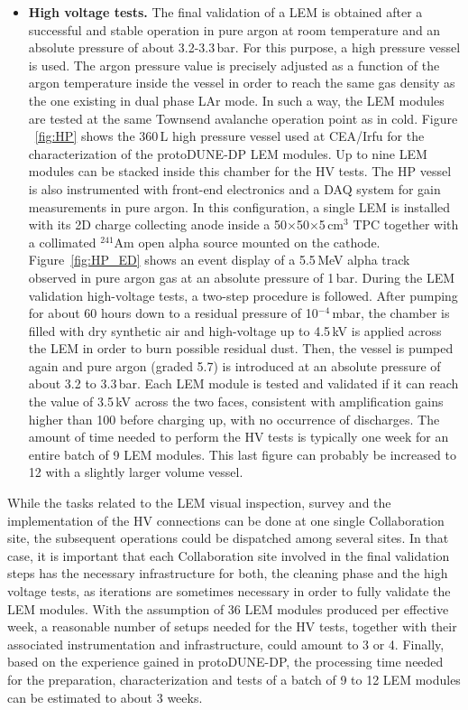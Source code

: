\begin{itemize}
\item {\bf High voltage tests.} The final validation of a LEM is obtained after a successful and stable operation in pure argon at room temperature and an absolute pressure of about 3.2-3.3\,bar. For this purpose, a high pressure vessel is used. The argon pressure value is precisely adjusted as a function of the argon temperature inside the vessel in order to reach the same gas density as the one existing in dual phase LAr mode. In such a way, the LEM modules are tested at the same Townsend avalanche operation point as in cold. Figure ~\ref{fig:HP} shows the 360\,L high pressure vessel used at CEA/Irfu for the characterization of the protoDUNE-DP LEM modules. Up to nine LEM modules can be stacked inside this chamber for the HV tests. The HP vessel is also instrumented with front-end electronics and a DAQ system for gain measurements in pure argon. In this configuration, a single LEM is installed with its 2D charge collecting anode inside 
a 50$\times$50$\times$5\,cm$^3$ TPC together with a collimated $^{241}$Am open alpha source mounted on 
the cathode. Figure~\ref{fig:HP_ED} shows an event display of a 5.5\,MeV alpha track observed in pure argon gas at an 
absolute pressure of 1\,bar.
During the LEM validation high-voltage tests, a two-step procedure is followed. After pumping for 
about 60 hours down to a residual pressure of 10$^{-4}$\,mbar, the chamber is filled with dry synthetic air and 
high-voltage up to 4.5\,kV is applied across the LEM in order to 
burn possible residual dust. Then, the vessel is pumped again and pure argon (graded 5.7)
is introduced at an absolute pressure of about 3.2 to 3.3\,bar. Each LEM module is tested 
and validated if it can reach the value of 3.5\,kV across the two faces, consistent with amplification gains higher than 100 before charging up, with no occurrence of discharges. The amount of time needed to perform the HV tests is 
typically one week for an entire batch of 9 LEM modules. This last figure can probably be increased to 12 with a slightly larger volume vessel. 

\end{itemize}
While the tasks related to the LEM visual inspection, survey and the implementation of the HV connections can be done at 
one single Collaboration site, the subsequent operations could be dispatched among several sites. In that case, it is  important that each Collaboration site involved in the final validation steps has the necessary infrastructure for 
both, the cleaning phase and the high voltage tests, as iterations are sometimes necessary in order to fully validate the 
LEM modules. With the assumption of 36 LEM modules produced per effective week, a reasonable number of setups needed for the HV tests, together with their associated instrumentation and infrastructure, could amount to 3 or 4. Finally, based on the experience gained in protoDUNE-DP, the processing time needed for the preparation, characterization and tests of a batch of 9 to 12 LEM modules can be estimated to about 3 weeks.  

